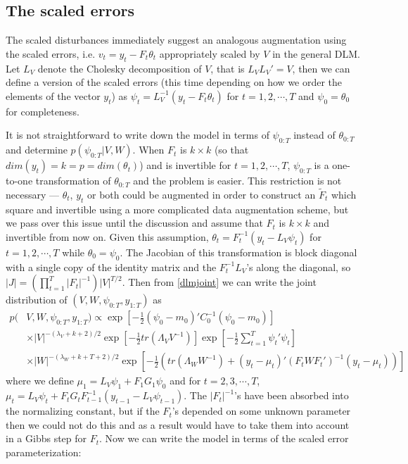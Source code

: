 \documentclass{article}
\begin{document}
\subsection{The scaled errors}\label{sec:scalederrors}
The scaled disturbances immediately suggest an analogous augmentation using the scaled errors, i.e. $v_t=y_t - F_t\theta_t$ appropriately scaled by $V$ in the general DLM. Let $L_V$ denote the Cholesky decomposition of $V$, that is $L_VL_V'=V$, then we can define a version of the scaled errors (this time depending on how we order the elements of the vector $y_t$) as $\psi_t = L_V^{-1}(y_t - F_t\theta_t)$ for $t=1,2,\cdots,T$ and $\psi_0 = \theta_0$ for completeness. 

It is not straightforward to write down the model in terms of $\psi_{0:T}$ instead of $\theta_{0:T}$ and determine $p(\psi_{0:T}|V,W)$. When $F_t$ is $k\times k$ (so that $dim(y_t)=k=p=dim(\theta_t)$) and is invertible for $t=1,2,\cdots,T$, $\psi_{0:T}$ is a one-to-one transformation of $\theta_{0:T}$ and the problem is easier. This restriction is not necessary --- $\theta_t$, $y_t$ or both could be augmented in order to construct an $\tilde{F}_t$ which square and invertible using a more complicated data augmentation scheme, but we pass over this issue until the discussion and assume that $F_t$ is $k\times k$ and invertible from now on. Given this assumption, $\theta_t = F_t^{-1}(y_t - L_V\psi_t)$ for $t=1,2,\cdots,T$ while $\theta_0=\psi_0$. The Jacobian of this transformation is block diagonal with a single copy of the identity matrix and the $F_t^{-1}L_V$'s along the diagonal, so $|J|=(\prod_{t=1}^T|F_t|^{-1})|V|^{T/2}$. Then from \eqref{dlmjoint} we can write the joint distribution of $(V, W, \psi_{0:T}, y_{1:T})$ as
\begin{align}
    p(&V,W,\psi_{0:T},y_{1:T}) \propto \exp\left[-\frac{1}{2}(\psi_0-m_0)'C_0^{-1}(\psi_0-m_0)\right] \nonumber\\
  &\times |V|^{-(\lambda_V + k + 2)/2}\exp\left[-\frac{1}{2}tr\left(\Lambda_VV^{-1}\right)\right] \exp\left[-\frac{1}{2}\sum_{t=1}^T\psi_t'\psi_t\right] \nonumber\\
   & \times |W|^{-(\lambda_W + k + T + 2)/2}\exp\left[-\frac{1}{2}\left(tr\left(\Lambda_WW^{-1}\right) + (y_t - \mu_t)'(F_tWF_t')^{-1}(y_t-\mu_t)\right)\right]\label{dlmerrorjoint}
\end{align}
where we define $\mu_1 = L_V\psi_1 + F_1G_1\psi_0$ and for $t=2,3,\cdots,T$, $\mu_t =L_V\psi_t + F_tG_tF_{t-1}^{-1}(y_{t-1} - L_{V}\psi_{t-1})$. The $|F_t|^{-1}$'s have been absorbed into the normalizing constant, but if the $F_t$'s depended on some unknown parameter then we could not do this and as a result would have to take them into account in a Gibbs step for $F_t$. Now we can write the model in terms of the scaled error parameterization:
\end{document}
